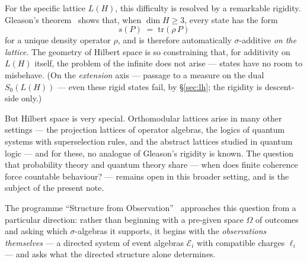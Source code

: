 \documentclass[11pt]{article}
\theoremstyle{definition}
\newcommand{\tr}{\mathrm{tr}}
\begin{document}
For the specific lattice $L(H)$, this difficulty is resolved by a
remarkable rigidity.  Gleason's theorem~\cite{Gleason1957} shows
that, when $\dim H \geq 3$, every state has the form
\begin{equation}\label{eq:gleason}
  s(P) \;=\; \tr(\rho\, P)
\end{equation}
for a unique density operator $\rho$, and is therefore
automatically $\sigma$-additive \emph{on the lattice}.  The geometry
of Hilbert space is so constraining that, for additivity on $L(H)$
itself, the problem of the infinite does not arise --- states have no
room to misbehave.  (On the \emph{extension} axis --- passage to a
measure on the dual $S_0(L(H))$ --- even these rigid states fail, by
\S\ref{sec:lh}; the rigidity is descent-side only.)

But Hilbert space is very special.  Orthomodular lattices arise in
many other settings --- the projection lattices of operator
algebras, the logics of quantum systems with superselection rules,
and the abstract lattices studied in quantum logic --- and for
these, no analogue of Gleason's rigidity is known.  The question
that probability theory and quantum theory share --- when does
finite coherence force countable behaviour? --- remains open in
this broader setting, and is the subject of the present note.

\medskip

The programme ``Structure from Observation''~\cite{mahon2025}
approaches this question from a particular direction: rather than
beginning with a pre-given space $\Omega$ of outcomes and asking
which $\sigma$-algebras it supports, it begins with the
\emph{observations themselves} --- a directed system of event
algebras $\mathcal{E}_i$ with compatible charges $\ell_i$ --- and
asks what the directed structure alone determines.
\end{document}
